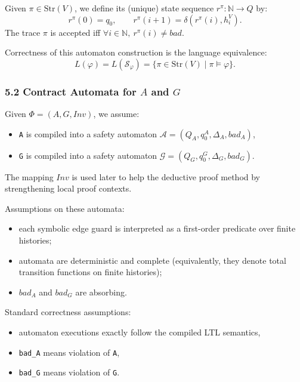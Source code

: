 \documentclass[
]{article}
\providecommand{\tightlist}{%
  \setlength{\itemsep}{0pt}\setlength{\parskip}{0pt}}
\begin{document}
Given \(\pi\in\mathrm{Str}(V)\), we define its (unique) state sequence
\(r^\pi:\mathbb N\to Q\) by: \[
r^\pi(0)=q_0,\qquad r^\pi(i+1)=\delta(r^\pi(i),h_i^V).
\] The trace \(\pi\) is accepted iff
\(\forall i\in\mathbb N,\ r^\pi(i)\neq bad\).

Correctness of this automaton construction is the language equivalence:
\[
L(\varphi)=L(\mathcal S_\varphi)
=\{\pi\in\mathrm{Str}(V) \mid \pi \models \varphi\}.
\]

\subsubsection{\texorpdfstring{5.2 Contract Automata for \(A\) and
\(G\)}{5.2 Contract Automata for A and G}}\label{contract-automata-for-a-and-g}

Given \(\Phi=(A,G,Inv)\), we assume:

\begin{itemize}
\tightlist
\item
  \texttt{A} is compiled into a safety automaton
  \(\mathcal A=(Q_A,q^A_0,\Delta_A,bad_A)\),
\item
  \texttt{G} is compiled into a safety automaton
  \(\mathcal G=(Q_G,q^G_0,\Delta_G,bad_G)\).
\end{itemize}

The mapping \(Inv\) is used later to help the deductive proof method by
strengthening local proof contexts.

Assumptions on these automata:

\begin{itemize}
\tightlist
\item
  each symbolic edge guard is interpreted as a first-order predicate
  over finite histories;
\item
  automata are deterministic and complete (equivalently, they denote
  total transition functions on finite histories);
\item
  \(bad_A\) and \(bad_G\) are absorbing.
\end{itemize}

Standard correctness assumptions:

\begin{itemize}
\tightlist
\item
  automaton executions exactly follow the compiled LTL semantics,
\item
  \texttt{bad\_A} means violation of \texttt{A},
\item
  \texttt{bad\_G} means violation of \texttt{G}.
\end{itemize}
\end{document}

